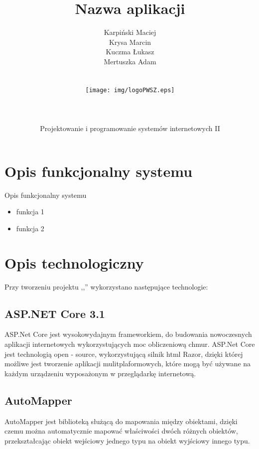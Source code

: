 \documentclass[12pt,a4paper]{article}
\author{Karpiński Maciej\\Krysa Marcin\\Kuczma Łukasz\\Mertuszka Adam\\\\\\\texttt{[image: img/logoPWSZ.eps]}\\\\\\\\Projektowanie i programowanie systemów internetowych II}
\title{Nazwa aplikacji}
\begin{document}
	\maketitle
	\thispagestyle{empty}
	\clearpage

	\tableofcontents
	\newpage

	\section{Opis funkcjonalny systemu}
		\indent Opis funkcjonalny systemu
		\begin{itemize}
			\item funkcja 1
			\item funkcja 2
		\end{itemize}
	\newpage

	\section{Opis technologiczny}
		\indent Przy tworzeniu projektu ,,'' wykorzystano następujące technologie:

		\subsection{ASP.NET Core 3.1}
			\indent ASP.Net Core jest wysokowydajnym frameworkiem, do budowania nowoczesnych aplikacji internetowych wykorzystujących moc obliczeniową chmur. ASP.Net Core jest technologią
			open - source, wykorzystującą silnik html Razor, dzięki której możliwe jest tworzenie aplikacji mulitplaformowych, które mogą być używane na każdym urządzeniu wyposażonym
			w przeglądarkę internetową.

		\subsection{AutoMapper}
			\indent AutoMapper jest biblioteką służącą do mapowania między obiektami, dzięki czemu można automatycznie mapować właściwości dwóch różnych obiektów,
					przekształcając obiekt wejściowy jednego typu na obiekt wyjściowy innego typu.  
\end{document}
